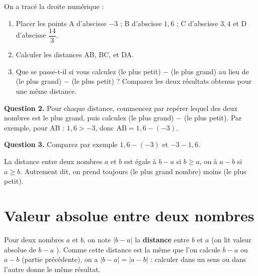 \documentclass[10pt,a4paper]{article}
\begin{document}
\begin{exo}[][]

    On a tracé la droite numérique :

    \vspace{1cm}

    \begin{enumerate}
        \item Placer les points A d'abscisse \(-3\) ; B d'abscisse \(1,6\) ; C d'abscisse \(3,4\) et D d'abscisse \(\dfrac{14}{3}\).
        \item Calculer les distances AB, BC, et DA.
        \item Que se passe-t-il si vous calculez (le plus petit) \(-\) (le plus grand) au lieu de (le plus grand) \(-\) (le plus petit) ? Comparez les deux résultats obtenus pour une même distance.
    \end{enumerate}

    \begin{indication}
        \textbf{Question 2.} Pour chaque distance, commencez par repérer lequel des deux nombres est le plus grand, puis calculez (le plus grand) \(-\) (le plus petit). Par exemple, pour AB : \(1,6 > -3\), donc \(\text{AB} = 1,6-(-3)\).

        \textbf{Question 3.} Comparez par exemple \(1,6-(-3)\) et \(-3-1,6\).
    \end{indication}
\end{exo}

\begin{prop}
    La distance entre deux nombres \(a\) et \(b\) est égale à \(b-a\) si \(b\geq a\), ou à \(a-b\) si \(a\geq b\). Autrement dit, on prend toujours (le plus grand nombre) moins (le plus petit).
\end{prop}

\newpage

\section{Valeur absolue entre deux nombres}

Pour deux nombres \(a\) et \(b\), on note \(|b-a|\) la \textbf{distance} entre \(b\) et \(a\) (on lit \og valeur absolue de \(b-a\) \fg{}). Comme cette distance est la même que l'on calcule \(b-a\) ou \(a-b\) (partie précédente), on a \(|b-a| = |a-b|\) : calculer dans un sens ou dans l'autre donne le même résultat.
\end{document}
